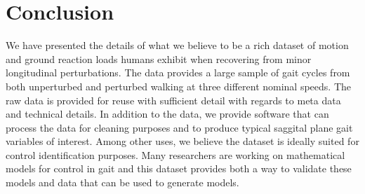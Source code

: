 \documentclass{article}
\begin{document}
\section{Conclusion}

We have presented the details of what we believe to be a rich dataset of motion
and ground reaction loads humans exhibit when recovering from minor
longitudinal perturbations. The data provides a large sample of gait cycles
from both unperturbed and perturbed walking at three different nominal speeds.
The raw data is provided for reuse with sufficient detail with regards to meta
data and technical details. In addition to the data, we provide software that
can process the data for cleaning purposes and to produce typical saggital
plane gait variables of interest. Among other uses, we believe the dataset is
ideally suited for control identification purposes. Many researchers are
working on mathematical models for control in gait and this dataset provides
both a way to validate these models and data that can be used to generate
models.
\end{document}

